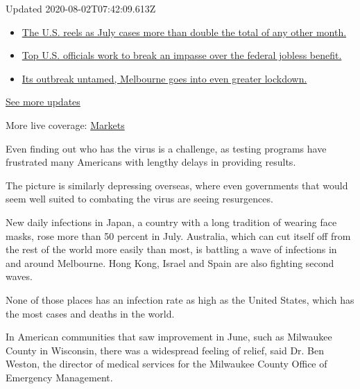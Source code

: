 Updated 2020-08-02T07:42:09.613Z

\begin{itemize}
\tightlist
\item
  \href{https://www.nytimes.com/2020/08/01/world/coronavirus-covid-19.html?action=click\&pgtype=Article\&state=default\&region=MAIN_CONTENT_1\&context=storylines_live_updates\#link-34047410}{The
  U.S. reels as July cases more than double the total of any other
  month.}
\item
  \href{https://www.nytimes.com/2020/08/01/world/coronavirus-covid-19.html?action=click\&pgtype=Article\&state=default\&region=MAIN_CONTENT_1\&context=storylines_live_updates\#link-780ec966}{Top
  U.S. officials work to break an impasse over the federal jobless
  benefit.}
\item
  \href{https://www.nytimes.com/2020/08/01/world/coronavirus-covid-19.html?action=click\&pgtype=Article\&state=default\&region=MAIN_CONTENT_1\&context=storylines_live_updates\#link-2bc8948}{Its
  outbreak untamed, Melbourne goes into even greater lockdown.}
\end{itemize}

\href{https://www.nytimes.com/2020/08/01/world/coronavirus-covid-19.html?action=click\&pgtype=Article\&state=default\&region=MAIN_CONTENT_1\&context=storylines_live_updates}{See
more updates}

More live coverage:
\href{https://www.nytimes.com/live/2020/07/31/business/stock-market-today-coronavirus?action=click\&pgtype=Article\&state=default\&region=MAIN_CONTENT_1\&context=storylines_live_updates}{Markets}

Even finding out who has the virus is a challenge, as testing programs
have frustrated many Americans with lengthy delays in providing results.

The picture is similarly depressing overseas, where even governments
that would seem well suited to combating the virus are seeing
resurgences.

New daily infections in Japan, a country with a long tradition of
wearing face masks, rose more than 50 percent in July. Australia, which
can cut itself off from the rest of the world more easily than most, is
battling a wave of infections in and around Melbourne. Hong Kong, Israel
and Spain are also fighting second waves.

None of those places has an infection rate as high as the United States,
which has the most cases and deaths in the world.

In American communities that saw improvement in June, such as Milwaukee
County in Wisconsin, there was a widespread feeling of relief, said Dr.
Ben Weston, the director of medical services for the Milwaukee County
Office of Emergency Management.

